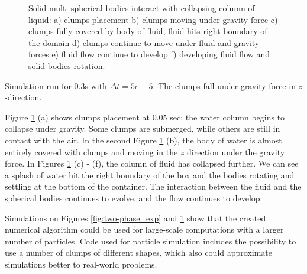 \begin{figure}[H]
\begin{minipage}{.4\textwidth}
    \end{minipage}
    \caption{Solid multi-spherical bodies interact with collapsing column of liquid: a) clumps placement b) clumps moving under gravity force c) clumps fully covered by body of fluid, fluid hits right boundary of the domain d) clumps continue to move under fluid and gravity forces e) fluid flow continue to develop f) developing fluid flow and solid bodies rotation.}
    \label{fig:two-phase_exp_clumps}
\end{figure}
Simulation run for $0.3$s with $\Delta t = 5e-5$. The clumps fall under gravity force in $z$-direction.

Figure \ref{fig:two-phase_exp_clumps} (a) shows clumps placement at $0.05$ sec; the water column begins to collapse under gravity. Some clumps are submerged, while others are still in contact with the air. In the second Figure \ref{fig:two-phase_exp_clumps} (b), the body of water is almost entirely covered with clumps and moving in the $z$ direction under the gravity force. In Figures \ref{fig:two-phase_exp_clumps} (c) - (f), the column of fluid has collapsed further. We can see a splash of water hit the right boundary of the box and the bodies rotating and settling at the bottom of the container. The interaction between the fluid and the spherical bodies continues to evolve, and the flow continues to develop.

Simulations on Figures \ref{fig:two-phase_exp} and \ref{fig:two-phase_exp_clumps} show that the created numerical algorithm could be used for large-scale computations with a larger number of particles. Code used for particle simulation \cite{LIGGGHTS} includes the possibility to use a number of clumps of different shapes, which also could approximate simulations better to real-world problems.

